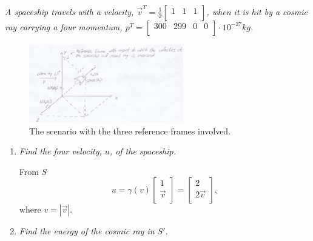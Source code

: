 \begin{example}
	\emph{A spaceship travels with a velocity, $\vec{v}^T=\frac{1}{2}\begin{bmatrix}
			1 & 1 & 1\\
		\end{bmatrix}$, when it is hit by a cosmic ray carrying a four momentum, $p^T=\begin{bmatrix}
			300 & 299 & 0& 0\\
		\end{bmatrix}\cdot10^{-27}kg$.}
	\begin{figure}[H]
		\captionsetup{width=1\textwidth}
		\centering
		\includegraphics[width=0.6\textwidth]{figures//ss}
		\caption{The scenario with the three reference frames involved.}
		\label{fig:ss}
	\end{figure} 
	\begin{enumerate}
		\item \emph{Find the four velocity, $u$, of the spaceship.}
		
		From $S$
		\begin{equation}
			u=\gamma(v)\begin{bmatrix}
				1 \\
				\vec{v}\\
			\end{bmatrix}=\begin{bmatrix}
				2 \\
				2\vec{v}\\
			\end{bmatrix},
		\end{equation} 
		where $v=|\vec{v}|$.
		
		\item \emph{Find the energy of the cosmic ray in $S'$.}
		

\end{enumerate}
\end{example}
